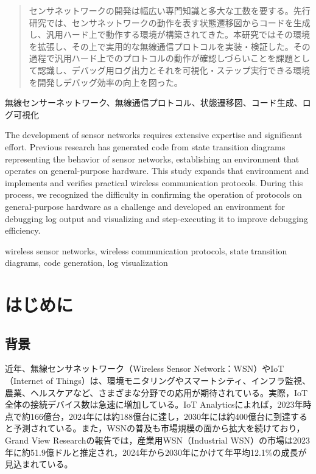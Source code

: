 \documentclass[technicalreport]{ieicej}
\begin{document}
\begin{abstract}
センサネットワークの開発は幅広い専門知識と多大な工数を要する。先行研究では、センサネットワークの動作を表す状態遷移図からコードを生成し、汎用ハード上で動作する環境が構築されてきた。本研究ではその環境を拡張し、その上で実用的な無線通信プロトコルを実装・検証した。その過程で汎用ハード上でのプロトコルの動作が確認しづらいことを課題として認識し、デバッグ用ログ出力とそれを可視化・ステップ実行できる環境を開発しデバッグ効率の向上を図った。
\end{abstract}
\begin{keyword}
無線センサーネットワーク、無線通信プロトコル、状態遷移図、コード生成、ログ可視化
\end{keyword}

\begin{eabstract}
The development of sensor networks requires extensive expertise and significant effort. Previous research has generated code from state transition diagrams representing the behavior of sensor networks, establishing an environment that operates on general-purpose hardware. This study expands that environment and implements and verifies practical wireless communication protocols. During this process, we recognized the difficulty in confirming the operation of protocols on general-purpose hardware as a challenge and developed an environment for debugging log output and visualizing and step-executing it to improve debugging efficiency.
\end{eabstract}

\begin{ekeyword}
wireless sensor networks, wireless communication protocols, state transition diagrams, code generation, log visualization
\end{ekeyword}
\maketitle

\section{はじめに}
\subsection{背景}
近年、無線センサネットワーク（Wireless Sensor Network：WSN）やIoT（Internet of Things）は、環境モニタリングやスマートシティ、インフラ監視、農業、ヘルスケアなど、さまざまな分野での応用が期待されている。実際，IoT全体の接続デバイス数は急速に増加している。IoT Analyticsによれば，2023年時点で約166億台，2024年には約188億台に達し，2030年には約400億台に到達すると予測されている\cite{iotanalytics2024}。また，WSNの普及も市場規模の面から拡大を続けており，Grand View Researchの報告では，産業用WSN（Industrial WSN）の市場は2023年に約51.9億ドルと推定され，2024年から2030年にかけて年平均12.1\%の成長が見込まれている\cite{grandview2024}。
\end{document}
